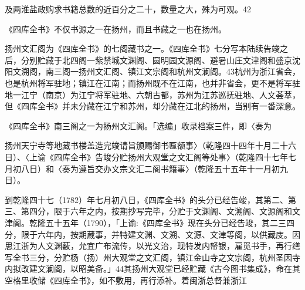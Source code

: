 \vfill
\begin{BookNotes}
\end{BookNotes}

\noindent 及两淮盐政购求书籍总数的近百分之二十，数量之大，殊为可观。42

\begin{BookQuote}
《四库全书》不仅书源之一在扬州，而且书藏之一也在扬州。
\end{BookQuote}

扬州文汇阁为《四库全书》的七阁藏书之一。《四库全书》七分写本陆续告竣之后，分别贮藏于北四阁一紫禁城文渊阁、圆明园文源阁、避暑山庄文津阁和盛京沈阳文溯阁，南三阁一扬州文汇阁、镇江文宗阁和杭州文澜阁。43杭州为浙江省会，也是杭州将军驻地；镇江在江南；而扬州既不在江南，也并非省会，更不是将军驻地一江宁（南京）为江宁将军驻地、六朝古都，苏州为江苏巡抚驻地、人文荟萃，但《四库全书》并未分藏在江宁和苏州，却分藏在江北的扬州，当别有一番深意。

\begin{BookQuote}
《四库全书》南三阁之一为扬州文汇阁。「选编」收录档案三件，即〈奏为
\end{BookQuote}

扬州天宁寺等地藏书楼盖造完竣请旨颁赐御书匾额事〉（乾隆四十四年十月二十六日）、〈上谕《四库全书》告竣分贮扬州大观堂之文汇阁等处事〉（乾隆四十七年七月初八日）和〈奏为遵旨交办文宗文汇二阁书籍事〉（乾隆五十五年十一月初九日）。

到乾隆四十七（1782）年七月初八日，《四库全书》的头分已经告竣，其第二、第三、第四分，限于六年之内，按期抄写完毕，分贮于文渊阁、文溯阁、文源阁和文津阁。乾隆五十五年（1790），「上谕:《四库全书》现在头分已经告竣，其二三四分，限于六年内，按期蔵事，并特建文渊、文溯、文源、文津等阁，以供藏庋。因思江浙为人文渊薮，允宜广布流传，以光文治，现特发内帑银，雇觅书手，再行缮写全书三分，分贮杨（扬）州大观堂之文汇阁，镇江金山寺之文宗阁，杭州圣因寺内拟改建文澜阁，以昭美备。」44其扬州大观堂已经贮藏《古今图书集成》，命在其空格里收储《四库全书》，如不敷用，再行添补。着闽浙总督兼浙江

\vfill
\begin{BookNotes}
\end{BookNotes}

